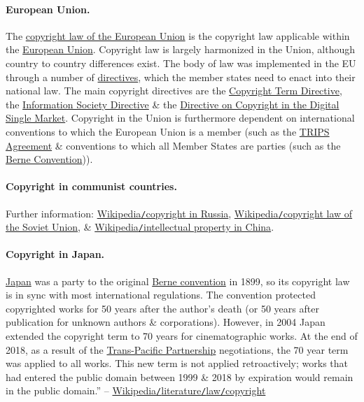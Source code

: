 \documentclass[oneside]{book}
\numberwithin{equation}{section}
\begin{document}
\paragraph{European Union.} The \href{https://en.wikipedia.org/wiki/Copyright_law_of_the_European_Union}{copyright law of the European Union} is the copyright law applicable within the \href{https://en.wikipedia.org/wiki/European_Union}{European Union}. Copyright law is largely harmonized in the Union, although country to country differences exist. The body of law was implemented in the EU through a number of \href{https://en.wikipedia.org/wiki/Directive_(European_Union)}{directives}, which the member states need to enact into their national law. The main copyright directives are the \href{https://en.wikipedia.org/wiki/Copyright_Term_Directive}{Copyright Term Directive}, the \href{https://en.wikipedia.org/wiki/Information_Society_Directive}{Information Society Directive} \& the \href{https://en.wikipedia.org/wiki/Directive_on_Copyright_in_the_Digital_Single_Market}{Directive on Copyright in the Digital Single Market}. Copyright in the Union is furthermore dependent on international conventions to which the European Union is a member (such as the \href{https://en.wikipedia.org/wiki/TRIPS_Agreement}{TRIPS Agreement} \& conventions to which all Member States are parties (such as the \href{https://en.wikipedia.org/wiki/Berne\_Convention}{Berne Convention})).

\paragraph{Copyright in communist countries.} Further information: \href{https://en.wikipedia.org/wiki/Copyright_in_Russia}{Wikipedia\texttt{/}copyright in Russia}, \href{https://en.wikipedia.org/wiki/Copyright_law_of_the_Soviet_Union}{Wikipedia\texttt{/}copyright law of the Soviet Union}, \& \href{https://en.wikipedia.org/wiki/Intellectual_property_in_China}{Wikipedia\texttt{/}intellectual property in China}.

\paragraph{Copyright in Japan.} \href{https://en.wikipedia.org/wiki/Copyright_in_Japan}{Japan} was a party to the original \href{https://en.wikipedia.org/wiki/Berne_convention}{Berne convention} in 1899, so its copyright law is in sync with most international regulations. The convention protected copyrighted works for 50 years after the author's death (or 50 years after publication for unknown authors \& corporations). However, in 2004 Japan extended the copyright term to 70 years for cinematographic works. At the end of 2018, as a result of the \href{https://en.wikipedia.org/wiki/Trans-Pacific_Partnership}{Trans-Pacific Partnership} negotiations, the 70 year term was applied to all works. This new term is not applied retroactively; works that had entered the public domain between 1999 \& 2018 by expiration would remain in the public domain.'' -- \href{https://en.wikipedia.org/wiki/Literature#Copyright}{Wikipedia\texttt{/}literature\texttt{/}law\texttt{/}copyright}
\end{document}
